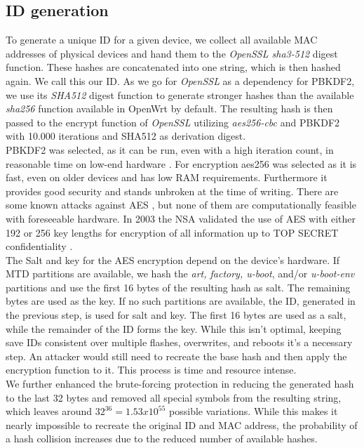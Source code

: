 \subsection{ID generation}
    To generate a unique ID for a given device, we collect all available MAC addresses of physical devices and hand them to the \textit{OpenSSL sha3-512} digest function. These hashes are concatenated into one string, which is then hashed again. We call this our ID. As we go for \textit{OpenSSL} as a dependency for PBKDF2, we use its \textit{SHA512} digest function to generate stronger hashes than the available \textit{sha256} function available in OpenWrt by default. The resulting hash is then passed to the encrypt function of \textit{OpenSSL} utilizing \textit{aes256-cbc} and PBKDF2 with 10.000 iterations and SHA512 as derivation digest.\\
    PBKDF2 was selected, as it can be run, even with a high iteration count, in reasonable time on low-end hardware \cite{ertaul_implementation_2016}. For encryption aes256 was selected as it is fast, even on older devices and has low RAM requirements. Furthermore it provides good security and stands unbroken at the time of writing. There are some known attacks against AES  \cite{schneier_another_2009} \cite{lu_new_2008} \cite{bernstein_cache-timing_nodate} \cite{biryukov_key_2009}, but none of them are computationally feasible with foreseeable hardware. In 2003 the NSA validated the use of AES with either 192 or 256 key lengths for encryption of all information up to TOP SECRET confidentiality \cite{noauthor_national_2003}.\\
    
        The Salt and key for the AES encryption depend on the device's hardware. If MTD partitions are available, we hash the \textit{art, factory, u-boot}, and/or \textit{u-boot-env} partitions and use the first 16 bytes of the resulting hash as salt. The remaining bytes are used as the key. If no such partitions are available, the ID, generated in the previous step, is used for salt and key. The first 16 bytes are used as a salt, while the remainder of the ID forms the key. While this isn't optimal, keeping save IDs consistent over multiple flashes, overwrites, and reboots it's a necessary step. An attacker would still need to recreate the base hash and then apply the encryption function to it. This process is time and resource intense.\\
    
     We further enhanced the brute-forcing protection in reducing the generated hash to the last 32 bytes and removed all special symbols from the resulting string, which leaves around $32^{36} = 1.53x10^{55}$ possible variations. While this makes it nearly impossible to recreate the original ID and MAC address, the probability of a hash collision increases due to the reduced number of available hashes.\\
    
